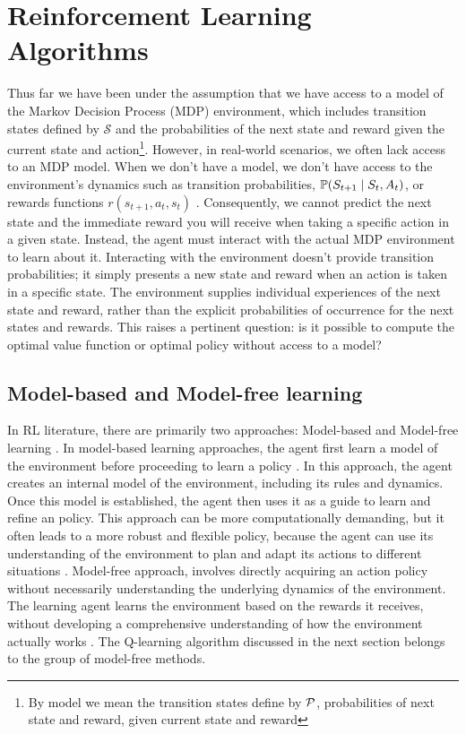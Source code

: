 \section{Reinforcement Learning Algorithms}\label{Algo}




Thus far we have been under the assumption that we have access to a model of the Markov Decision Process (MDP) environment, which includes transition states defined by $\mathcal{S}$ and the probabilities of the next state and reward given the current state and action\footnote{By model we mean the transition states define by $\mathcal P$, probabilities of next state and reward, given current state and reward}.
However, in real-world scenarios, we often lack access to an MDP model. 
When we don't have a model, we don't have access to the environment's dynamics such as transition probabilities, $\mathbb P(S_{t+1} \mid S_t , A_t)$, or rewards functions $r(s_{t+1}, a_t, s_t)$ . Consequently, we cannot predict the next state and the immediate reward you will receive when taking a specific action in a given state. 
Instead, the agent must interact with the actual MDP environment to learn about it. Interacting with the environment doesn't provide transition probabilities; it simply presents a new state and reward when an action is taken in a specific state. The environment supplies individual experiences of the next state and reward, rather than the explicit probabilities of occurrence for the next states and rewards. This raises a pertinent question: is it possible to compute the optimal value function or optimal policy without access to a model?

\subsection{Model-based and Model-free learning}
In RL literature, there are primarily two approaches:  Model-based and Model-free learning \cite{RL3}. In model-based learning approaches, the agent first learn a model of the environment before proceeding to learn a policy \cite{RL2}. In this approach, the agent creates an internal model of the environment, including its rules and dynamics. Once this model is established, the agent then uses it as a guide to learn and refine an  policy. This approach can be more computationally demanding, but it often leads to a more robust and flexible policy, because the agent can use its understanding of the environment to plan and adapt its actions to different situations \cite{RL}.
Model-free approach, involves directly acquiring an action policy without necessarily understanding the underlying dynamics of the environment. The learning agent learns the environment based on the rewards it receives, without developing a comprehensive understanding of how the environment actually works \cite{RL3}. The Q-learning algorithm  discussed in the next section belongs to the group of model-free methods.



